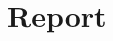 \documentclass[fleqn,10pt]{SelfArx} %
\begin{document}
	\section{Report}
	
	
	\newpage
	
	\onecolumn
	
\end{document}
